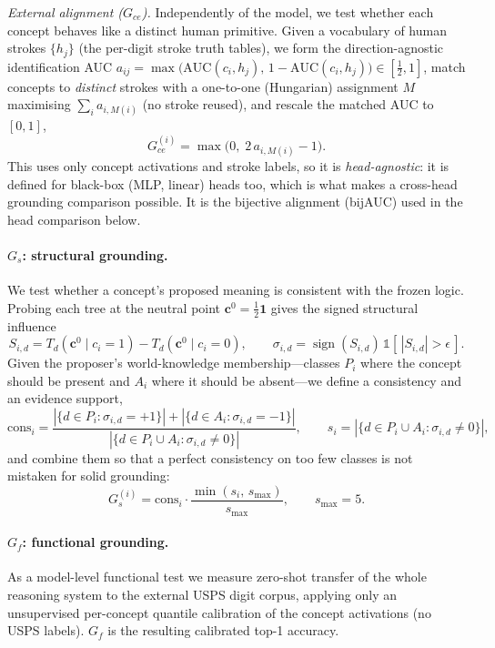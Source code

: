 \emph{External alignment ($G_{ce}$).} Independently of the model, we test whether
each concept behaves like a distinct human primitive. Given a vocabulary of human
strokes $\{h_j\}$ (the per-digit stroke truth tables), we form the
direction-agnostic identification AUC
$a_{ij}=\max\!\big(\mathrm{AUC}(c_i,h_j),\,1-\mathrm{AUC}(c_i,h_j)\big)\in[\tfrac12,1]$,
match concepts to \emph{distinct} strokes with a one-to-one (Hungarian) assignment
$M$ maximising $\sum_i a_{i,M(i)}$ (no stroke reused), and rescale the matched AUC to
$[0,1]$,
\begin{equation}
G_{ce}^{(i)} = \max\!\big(0,\; 2\,a_{i,M(i)}-1\big).
\end{equation}
This uses only concept activations and stroke labels, so it is \emph{head-agnostic}:
it is defined for black-box (MLP, linear) heads too, which is what makes a
cross-head grounding comparison possible. It is the bijective alignment (bijAUC)
used in the head comparison below.

\paragraph{$G_s$: structural grounding.}
We test whether a concept's proposed meaning is consistent with the frozen logic.
Probing each tree at the neutral point $\mathbf c^{0}=\tfrac12\mathbf 1$ gives the
signed structural influence
\begin{equation}
S_{i,d}=T_d(\mathbf c^{0}\!\mid c_i{=}1)-T_d(\mathbf c^{0}\!\mid c_i{=}0),
\qquad
\sigma_{i,d}=\operatorname{sign}(S_{i,d})\,\mathbb 1[\,|S_{i,d}|>\epsilon\,].
\end{equation}
Given the proposer's world-knowledge membership---classes $P_i$ where the concept
should be present and $A_i$ where it should be absent---we define a consistency and
an evidence support,
\begin{equation}
\mathrm{cons}_i=\frac{|\{d\in P_i:\sigma_{i,d}{=}{+}1\}|+|\{d\in A_i:\sigma_{i,d}{=}{-}1\}|}
{|\{d\in P_i\cup A_i:\sigma_{i,d}\neq0\}|},
\qquad
s_i=|\{d\in P_i\cup A_i:\sigma_{i,d}\neq0\}|,
\end{equation}
and combine them so that a perfect consistency on too few classes is not mistaken
for solid grounding:
\begin{equation}
G_s^{(i)}=\mathrm{cons}_i\cdot\frac{\min(s_i,\,s_{\max})}{s_{\max}},\qquad s_{\max}=5.
\end{equation}

\paragraph{$G_f$: functional grounding.}
As a model-level functional test we measure zero-shot transfer of the whole
reasoning system to the external USPS digit corpus, applying only an unsupervised
per-concept quantile calibration of the concept activations (no USPS labels). $G_f$
is the resulting calibrated top-1 accuracy.

